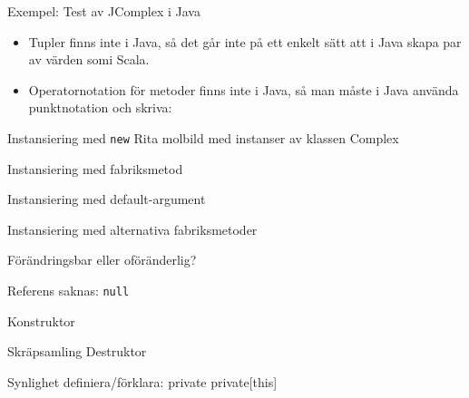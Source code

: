 \begin{Slide}{Exempel: Test av JComplex i Java}
\begin{itemize}
\item Tupler finns inte i Java, så det går inte på ett enkelt sätt att i Java skapa par av värden somi Scala.

\item Operatornotation för metoder finns inte i Java, så man måste i Java använda punktnotation och skriva: 
\end{itemize}
\end{Slide}



\begin{Slide}{Instansiering med \texttt{new}}
Rita molbild med instanser av klassen Complex
\end{Slide}

\begin{Slide}{Instansiering med fabriksmetod}
\end{Slide}

\begin{Slide}{Instansiering med default-argument}
\end{Slide}

\begin{Slide}{Instansiering med alternativa fabriksmetoder}
\end{Slide}

\begin{Slide}{Förändringsbar eller oföränderlig?}
\end{Slide}



\begin{Slide}{Referens saknas: \texttt{null}}
\end{Slide}


\begin{Slide}{Konstruktor}
\end{Slide}

\begin{Slide}{Skräpsamling}
Destruktor
\end{Slide}


\begin{Slide}{Synlighet}
definiera/förklara:
private
private[this]
\end{Slide}

